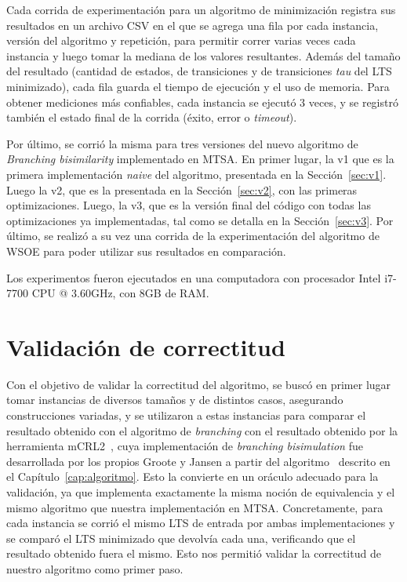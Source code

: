 Cada corrida de experimentación para un algoritmo de minimización registra sus resultados en un archivo CSV en el que se agrega una fila por cada instancia, versión del algoritmo y repetición, para permitir correr varias veces cada instancia y luego tomar la mediana de los valores resultantes. Además del tamaño del resultado (cantidad de estados, de transiciones y de transiciones \textit{tau} del LTS minimizado), cada fila guarda el tiempo de ejecución y el uso de memoria. Para obtener mediciones más confiables, cada instancia se ejecutó 3 veces, y se registró también el estado final de la corrida (éxito, error o \textit{timeout}).

Por último, se corrió la misma para tres versiones del nuevo algoritmo de \textit{Branching bisimilarity} implementado en MTSA. En primer lugar, la v1 que es la primera implementación \textit{naive} del algoritmo, presentada en la Sección~\ref{sec:v1}. Luego la v2, que es la presentada en la Sección~\ref{sec:v2}, con las primeras optimizaciones. Luego, la v3, que es la versión final del código con todas las optimizaciones ya implementadas, tal como se detalla en la Sección~\ref{sec:v3}. Por último, se realizó a su vez una corrida de la experimentación del algoritmo de WSOE para poder utilizar sus resultados en comparación.

Los experimentos fueron ejecutados en una computadora con procesador Intel i7-7700 CPU @ 3.60GHz, con 8GB de RAM.

\section{Validación de correctitud}

Con el objetivo de validar la correctitud del algoritmo, se buscó en primer lugar tomar instancias de diversos tamaños y de distintos casos, asegurando construcciones variadas, y se utilizaron a estas instancias para comparar el resultado obtenido con el algoritmo de \textit{branching} con el resultado obtenido por la herramienta mCRL2~\cite{mcrl2}, cuya implementación de \textit{branching bisimulation} fue desarrollada por los propios Groote y Jansen a partir del algoritmo~\cite{groote2019} descrito en el Capítulo~\ref{cap:algoritmo}. Esto la convierte en un oráculo adecuado para la validación, ya que implementa exactamente la misma noción de equivalencia y el mismo algoritmo que nuestra implementación en MTSA. Concretamente, para cada instancia se corrió el mismo LTS de entrada por ambas implementaciones y se comparó el LTS minimizado que devolvía cada una, verificando que el resultado obtenido fuera el mismo. Esto nos permitió validar la correctitud de nuestro algoritmo como primer paso.

